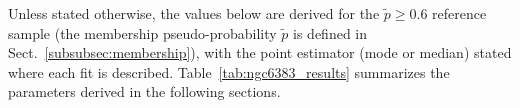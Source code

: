 \documentclass{aa}
\providecommand{\DIFdeltex}[1]{{\protect\color[rgb]{0.65,0,0}\footnotesize #1}} %
\providecommand{\DIFdelFL}[1]{\DIFdel{#1}} %
\providecommand{\DIFdelbeginFL}{} %
\providecommand{\DIFdelendFL}{} %
\providecommand{\DIFdel}[1]{\texorpdfstring{\DIFdeltex{#1}}{}} %
\providecommand{\DIFscaledelfig}{0.5}
\newlength{\DIFdelgraphicswidth} %
\newlength{\DIFdelgraphicsheight} %
\providecommand{\DIFdelincludegraphics}[2][]{%
\sbox{\DIFdelgraphicsbox}{\DIFOincludegraphics[#1]{#2}}%
\settoboxwidth{\DIFdelgraphicswidth}{\DIFdelgraphicsbox} %
\settoboxtotalheight{\DIFdelgraphicsheight}{\DIFdelgraphicsbox} %
\scalebox{\DIFscaledelfig}{%
\parbox[b]{\DIFdelgraphicswidth}{\usebox{\DIFdelgraphicsbox}\\[-\baselineskip] \rule{\DIFdelgraphicswidth}{0em}}\llap{\resizebox{\DIFdelgraphicswidth}{\DIFdelgraphicsheight}{%
\setlength{\unitlength}{\DIFdelgraphicswidth}%
\begin{picture}(1,1)%
\thicklines\linethickness{2pt} %
{\color[rgb]{1,0,0}\put(0,0){\framebox(1,1){}}}%
{\color[rgb]{1,0,0}\put(0,0){\line( 1,1){1}}}%
{\color[rgb]{1,0,0}\put(0,1){\line(1,-1){1}}}%
\end{picture}%
}\hspace*{3pt}}} %
} %
\DeclareRobustCommand{\DIFdelbeginFL}{\DIFOdelbeginFL \let\includegraphics\DIFdelincludegraphics} %
\DeclareRobustCommand{\DIFdelendFL}{\DIFOaddendFL \let\includegraphics\DIFOincludegraphics} %
\begin{document}
Unless stated otherwise, the values below are derived for the $\tilde{p}\geq0.6$ reference sample (the membership pseudo-probability $\tilde{p}$ is defined in Sect.~\ref{subsubsec:membership}), with the point estimator (mode or median) stated where each fit is described. Table~\ref{tab:ngc6383_results} summarizes the parameters derived in the following sections.
\begin{table}
		\caption{Summary of derived parameters for NGC 6383, for the $\tilde{p}\geq0.6$ reference sample.\DIFdelbeginFL \DIFdelFL{Unless otherwise stated, the quoted uncertainties are the 1$\sigma$ posterior uncertainty or the 1$\sigma$ dispersion of the relevant member distribution.}\DIFdelendFL }
	\centering
	\DIFdelbeginFL %

\end{table}
\end{document}
